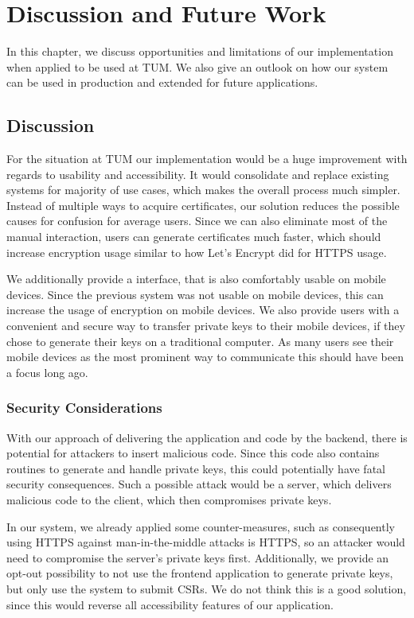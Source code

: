\chapter{Discussion and Future Work}\label{ch:futureWork}

In this chapter, we discuss opportunities and limitations of our implementation when applied to be used at TUM\@.
We also give an outlook on how our system can be used in production and extended for future applications.

\section*{Discussion}
For the situation at TUM our implementation would be a huge improvement with regards to usability and accessibility.
It would consolidate and replace existing systems for majority of use cases, which makes the overall process much
simpler.
Instead of multiple ways to acquire certificates, our solution reduces the possible causes for confusion for average
users.
Since we can also eliminate most of the manual interaction, users can generate certificates much faster, which should
increase encryption usage similar to how Let's Encrypt did for HTTPS usage.

We additionally provide a interface, that is also comfortably usable on mobile devices.
Since the previous system was not usable on mobile devices, this can increase the usage of encryption on mobile devices.
We also provide users with a convenient and secure way to transfer private keys to their mobile devices, if they chose
to generate their keys on a traditional computer.
As many users see their mobile devices as the most prominent way to communicate this should have been a focus long ago.

\subsection*{Security Considerations}
With our approach of delivering the application and code by the backend, there is potential for attackers to insert
malicious code.
Since this code also contains routines to generate and handle private keys, this could potentially have fatal security
consequences.
Such a possible attack would be a server, which delivers malicious code to the client, which then compromises private
keys.

In our system, we already applied some counter-measures, such as consequently using HTTPS against man-in-the-middle
attacks is HTTPS, so an attacker would need to compromise the server's private keys first.
Additionally, we provide an opt-out possibility to not use the frontend application to generate private keys, but only
use the system to submit CSRs.
We do not think this is a good solution, since this would reverse all accessibility features of our application.

